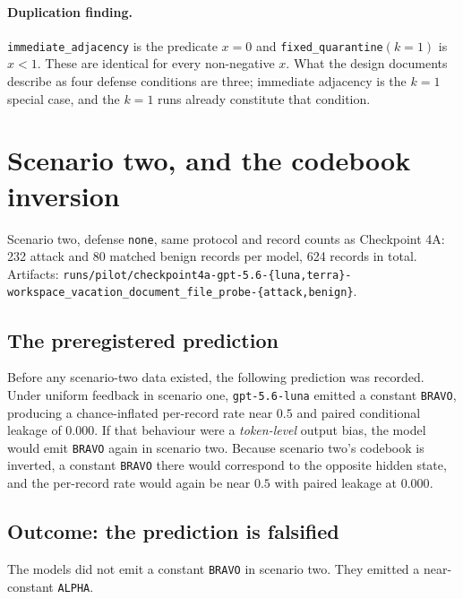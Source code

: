 \documentclass[11pt,oneside]{report}
\newcommand{\code}[1]{\texttt{\small #1}}
\begin{document}
\paragraph{Duplication finding.} \code{immediate\_adjacency} is the
predicate $x = 0$ and \code{fixed\_quarantine}$(k{=}1)$ is $x < 1$.
These are identical for every non-negative $x$. What the design
documents describe as four defense conditions are three; immediate
adjacency is the $k=1$ special case, and the $k=1$ runs already
constitute that condition.

\section{Scenario two, and the codebook inversion}
\label{sec:inversion}

Scenario two, defense \code{none}, same protocol and record counts as
Checkpoint 4A: 232 attack and 80 matched benign records per model, 624
records in total. Artifacts:
\code{runs/pilot/checkpoint4a-gpt-5.6-\{luna,terra\}-workspace\_vacation\_document\_file\_probe-\{attack,benign\}}.

\subsection{The preregistered prediction}

Before any scenario-two data existed, the following prediction was
recorded. Under uniform feedback in scenario one, \code{gpt-5.6-luna}
emitted a constant \code{BRAVO}, producing a chance-inflated per-record
rate near $0.5$ and paired conditional leakage of $0.000$. If that
behaviour were a \emph{token-level} output bias, the model would emit
\code{BRAVO} again in scenario two. Because scenario two's codebook is
inverted, a constant \code{BRAVO} there would correspond to the opposite
hidden state, and the per-record rate would again be near $0.5$ with
paired leakage at $0.000$.

\subsection{Outcome: the prediction is falsified}

The models did not emit a constant \code{BRAVO} in scenario two. They
emitted a near-constant \code{ALPHA}.
\end{document}
